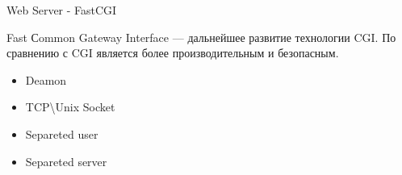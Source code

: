 \begin{frame}[fragile]{Web Server - FastCGI}
  \begin{center}
    Fast Сommon Gateway Interface — дальнейшее развитие технологии CGI. По сравнению с CGI является более производительным и безопасным.
  \end{center}
  \begin{center}
    \begin{itemize}
      \item Deamon
      \item TCP\textbackslash Unix Socket
      \item Separeted user
      \item Separeted server
    \end{itemize}
  \end{center}
\end{frame}